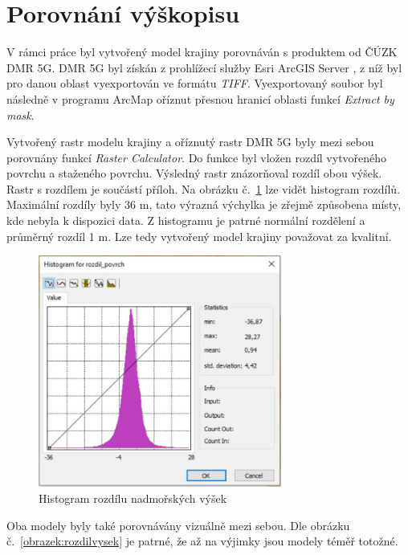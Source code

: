 \documentclass[thesis=M,czech]{FITthesis}[2012/06/26]
\begin{document}
\section{Porovnání výškopisu}
V rámci práce byl vytvořený model krajiny porovnáván s produktem od ČÚZK DMR 5G. DMR 5G byl získán z prohlížecí služby Esri ArcGIS Server \cite{dmr}, z níž byl pro danou oblast vyexportován ve formátu \textit{TIFF}. Vyexportovaný soubor byl následně v programu ArcMap oříznut přesnou hranicí oblasti funkcí \textit{Extract by mask}. 

Vytvořený rastr modelu krajiny a oříznutý rastr DMR 5G byly mezi sebou porovnány funkcí \textit{Raster Calculator}. Do funkce byl vložen rozdíl vytvořeného povrchu a staženého povrchu. Výsledný rastr znázorňoval rozdíl obou výšek. Rastr s rozdílem je součástí příloh. Na obrázku č.~\ref{obrazek:histogram} lze vidět histogram rozdílů. Maximální rozdíly byly 36 m, tato výrazná výchylka je zřejmě způsobena místy, kde nebyla k dispozici data. Z histogramu je patrné normální rozdělení a průměrný rozdíl 1 m. Lze tedy vytvořený model krajiny považovat za kvalitní. 

\begin{figure}[h]
	\centering
	\includegraphics[width=8cm]{pics/histogram.jpg}
	\caption{Histogram rozdílu nadmořských výšek}
	\label{obrazek:histogram}
\end{figure}

Oba modely byly také porovnávány vizuálně mezi sebou. Dle obrázku č.~\ref{obrazek:rozdilvysek} je patrné, že až na výjimky jsou modely téměř totožné. 
\end{document}
